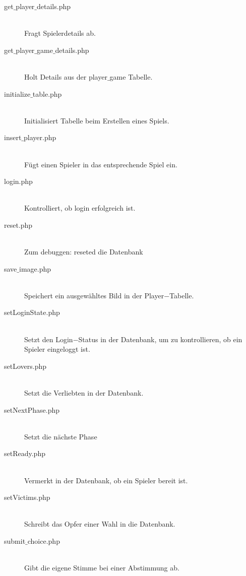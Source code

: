 \documentclass[12pt, a4paper]{article}
\begin{document}
\begin{description}
\item[get$\_$player$\_$details.php]\hfill \\
Fragt Spielerdetails ab.

\item[get$\_$player$\_$game$\_$details.php]\hfill \\
Holt Details aus der player$\_$game Tabelle.
	
\item[initialize$\_$table.php]\hfill \\
Initialisiert Tabelle beim Erstellen eines Spiels.	
	
\item[insert$\_$player.php]\hfill \\
Fügt einen Spieler in das entsprechende Spiel ein.
	
\item[login.php]\hfill \\
Kontrolliert, ob login erfolgreich ist.
	
\item[reset.php]\hfill \\
Zum debuggen: reseted die Datenbank
	
\item[save$\_$image.php]\hfill \\
Speichert ein ausgewähltes Bild in der Player$-$Tabelle.
	
\item[setLoginState.php]\hfill \\
Setzt den Login$-$Status in der Datenbank, um zu kontrollieren, ob ein Spieler eingeloggt ist.
	
\item[setLovers.php]\hfill \\
Setzt die Verliebten in der Datenbank.	
	
\item[setNextPhase.php]\hfill \\
Setzt die nächste Phase
	
\item[setReady.php]\hfill \\
Vermerkt in der Datenbank, ob ein Spieler bereit ist.
	
\item[setVictims.php]\hfill \\
Schreibt das Opfer einer Wahl in die Datenbank.
	
\item[submit$\_$choice.php]\hfill \\
Gibt die eigene Stimme bei einer Abstimmung ab.
	

\end{description}
\end{document}
